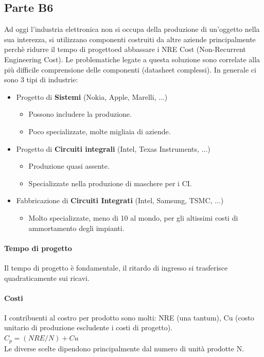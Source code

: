 \documentclass[12pt]{article}
\begin{document}
\subsection{Parte B6}\label{b6}
Ad oggi l'industria elettronica non si occupa della produzione di un'oggetto nella sua interezza, si utilizzano componenti costruiti da altre aziende principalmente perchè ridurre il tempo di progettoed abbassare i NRE Cost (Non-Recurrent Engineering Cost). Le problematiche legate a questa soluzione sono correlate alla più difficile comprensione delle componenti (datasheet complessi). In generale ci sono 3 tipi di industrie:
\begin{itemize}
  \item Progetto di \textbf{Sistemi} (Nokia, Apple, Marelli, ...)
  \begin{itemize}
    \item Possono includere la produzione.
    \item Poco specializzate, molte migliaia di aziende.
  \end{itemize}
  \item Progetto di \textbf{Circuiti integrali} (Intel, Texas Instruments, ...)
  \begin{itemize}
    \item Produzione quasi assente.
    \item Specializzate nella produzione di maschere per i CI.
  \end{itemize}
  \item Fabbricazione di \textbf{Circuiti Integrati} (Intel, Samsung, TSMC, ...)
  \begin{itemize}
    \item Molto specializzate, meno di 10 al mondo, per gli altissimi costi di ammortamento degli impianti.
  \end{itemize}
\end{itemize}

\paragraph{Tempo di progetto}
Il tempo di progetto è fondamentale, il ritardo di ingresso si trasferisce quadraticamente sui ricavi.
\paragraph{Costi}
I contribuenti al costro per prodotto sono molti: NRE (una tantum), Cu (costo unitario di produzione escludente i costi di progetto).\\
$C_{p} = (NRE/N) + Cu$\\
Le diverse scelte dipendono principalmente dal numero di unità prodotte N.
\end{document}
